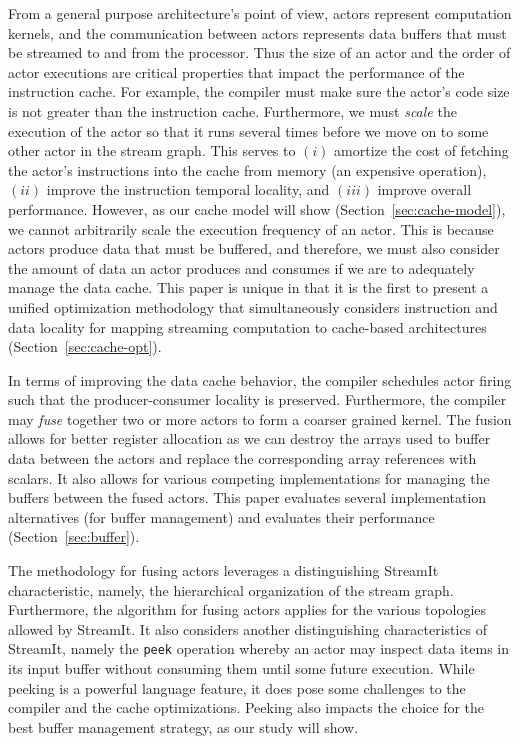 From a general purpose architecture's point of view, actors represent
computation kernels, and the communication between actors represents
data buffers that must be streamed to and from the processor. Thus
the size of an actor and the
order of actor executions are critical properties that
impact the performance of the instruction cache. For example, the
compiler must make sure the actor's code size is not
greater than the instruction cache. Furthermore, we must {\it scale}
the execution of the actor so that it runs several times before we move
on to some other actor in the stream 
graph. This serves to $(i)$ amortize the cost of fetching the actor's
instructions into the cache from memory (an expensive operation), $(ii)$
improve the instruction temporal locality, and $(iii)$ improve overall
performance. However, as our cache model will show
(Section~\ref{sec:cache-model}), we 
cannot arbitrarily scale the execution frequency of an actor. This
is because actors produce data that must be buffered, and therefore,
we must also consider the amount of data an actor produces and
consumes if we are to adequately manage the data cache. This paper is unique
in that it is the first to present a unified optimization methodology
that simultaneously considers instruction and data locality for
mapping streaming computation to cache-based architectures (Section~\ref{sec:cache-opt}).

In terms of improving the data cache behavior, the compiler schedules
actor firing such that the producer-consumer locality is
preserved. Furthermore,  the compiler may {\it fuse}
together two or more actors to form a coarser grained kernel.
The fusion allows for better register allocation as we can
destroy the arrays used to buffer data between the actors and replace
the corresponding array references with scalars.  It also allows for
various competing implementations for managing the buffers between the
fused actors.  This paper evaluates several implementation
alternatives (for buffer management) and evaluates their performance
(Section~\ref{sec:buffer}).

The methodology for fusing actors leverages a distinguishing StreamIt
characteristic, namely, the hierarchical organization of
the stream graph. Furthermore, the algorithm for fusing actors applies
for the various topologies allowed by StreamIt.
It also considers another distinguishing characteristics of StreamIt,
namely the {\tt peek} operation whereby an actor may inspect data
items in its input buffer without consuming them until some future
execution. While peeking is a powerful language feature, it does pose
some challenges to the compiler and the cache optimizations. Peeking
also impacts the choice for the best buffer management strategy, as our
study will show.

